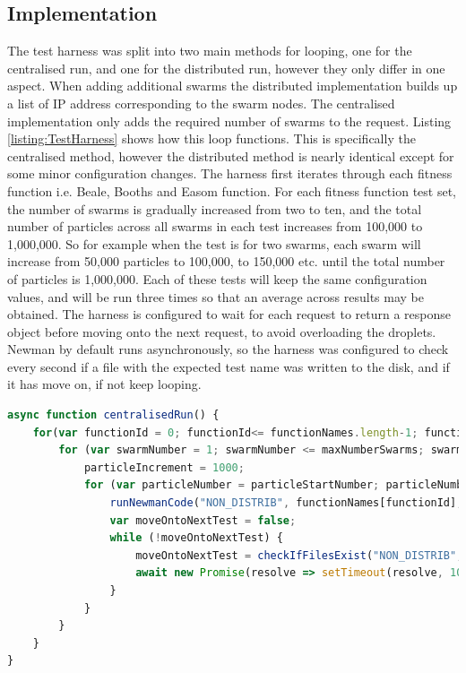 \documentclass[oneside,12pt]{book}
\begin{document}
\subsection{Implementation}
The test harness was split into two main methods for looping, one for the centralised run, and one for the distributed run, however they only differ in one aspect. When adding additional swarms the distributed implementation builds up a list of IP address corresponding to the swarm nodes. The centralised implementation only adds the required number of swarms to the request. Listing \ref{listing:TestHarness} shows how this loop functions. This is specifically the centralised method, however the distributed method is nearly identical except for some minor configuration changes. The harness first iterates through each fitness function i.e. Beale, Booths and Easom function. For each fitness function test set, the number of swarms is gradually increased from two to ten, and the total number of particles across all swarms in each test increases from 100,000 to 1,000,000. So for example when the test is for two swarms, each swarm will increase from 50,000 particles to 100,000, to 150,000 etc. until the total number of particles is 1,000,000. Each of these tests will keep the same configuration values, and will be run three times so that an average across results may be obtained. The harness is configured to wait for each request to return a response object before moving onto the next request, to avoid overloading the droplets. Newman by default runs asynchronously, so the harness was configured to check every second if a file with the expected test name was written to the disk, and if it has move on, if not keep looping. 

\begin{lstlisting}[basicstyle=\footnotesize, language=JavaScript]
async function centralisedRun() {
    for(var functionId = 0; functionId<= functionNames.length-1; functionId ++) {
        for (var swarmNumber = 1; swarmNumber <= maxNumberSwarms; swarmNumber++) {
            particleIncrement = 1000;
            for (var particleNumber = particleStartNumber; particleNumber <= maxNumberParticles; particleNumber += particleIncrement) {
                runNewmanCode("NON_DISTRIB", functionNames[functionId], "Remote", swarmNumber, particleNumber, baseUrlStringsNonDistributed, nonDistribEndpoint);
                var moveOntoNextTest = false;
                while (!moveOntoNextTest) {
                    moveOntoNextTest = checkIfFilesExist("NON_DISTRIB", functionNames[functionId], swarmNumber, particleNumber);
                    await new Promise(resolve => setTimeout(resolve, 1000));
                }
            }
        }
    }
}
\end{lstlisting}
\label{listing:TestHarness}
\end{document}
